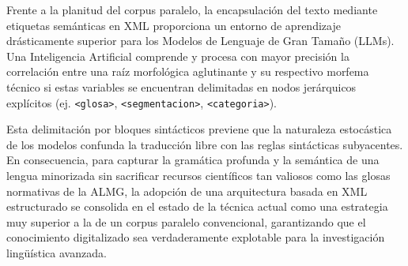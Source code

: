Frente a la planitud del corpus paralelo, la encapsulación del texto mediante etiquetas semánticas en XML proporciona un entorno de aprendizaje drásticamente superior para los Modelos de Lenguaje de Gran Tamaño (LLMs). Una Inteligencia Artificial comprende y procesa con mayor precisión la correlación entre una raíz morfológica aglutinante y su respectivo morfema técnico si estas variables se encuentran delimitadas en nodos jerárquicos explícitos (ej. \texttt{<glosa>}, \texttt{<segmentacion>}, \texttt{<categoria>}).

Esta delimitación por bloques sintácticos previene que la naturaleza estocástica de los modelos confunda la traducción libre con las reglas sintácticas subyacentes. En consecuencia, para capturar la gramática profunda y la semántica de una lengua minorizada sin sacrificar recursos científicos tan valiosos como las glosas normativas de la ALMG, la adopción de una arquitectura basada en XML estructurado se consolida en el estado de la técnica actual como una estrategia muy superior a la de un corpus paralelo convencional, garantizando que el conocimiento digitalizado sea verdaderamente explotable para la investigación lingüística avanzada.




















